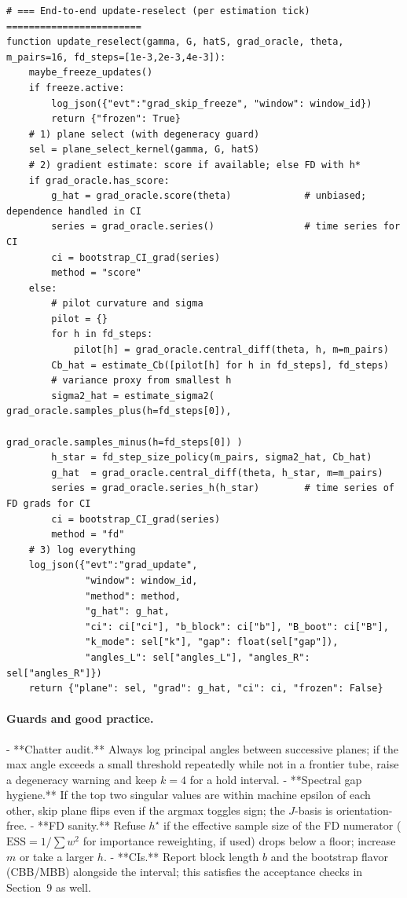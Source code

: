 \begin{lstlisting}
# === End-to-end update-reselect (per estimation tick) ========================
function update_reselect(gamma, G, hatS, grad_oracle, theta, m_pairs=16, fd_steps=[1e-3,2e-3,4e-3]):
    maybe_freeze_updates()
    if freeze.active:
        log_json({"evt":"grad_skip_freeze", "window": window_id})
        return {"frozen": True}
    # 1) plane select (with degeneracy guard)
    sel = plane_select_kernel(gamma, G, hatS)
    # 2) gradient estimate: score if available; else FD with h*
    if grad_oracle.has_score:
        g_hat = grad_oracle.score(theta)             # unbiased; dependence handled in CI
        series = grad_oracle.series()                # time series for CI
        ci = bootstrap_CI_grad(series)
        method = "score"
    else:
        # pilot curvature and sigma
        pilot = {}
        for h in fd_steps:
            pilot[h] = grad_oracle.central_diff(theta, h, m=m_pairs)
        Cb_hat = estimate_Cb([pilot[h] for h in fd_steps], fd_steps)
        # variance proxy from smallest h
        sigma2_hat = estimate_sigma2( grad_oracle.samples_plus(h=fd_steps[0]),
                                      grad_oracle.samples_minus(h=fd_steps[0]) )
        h_star = fd_step_size_policy(m_pairs, sigma2_hat, Cb_hat)
        g_hat  = grad_oracle.central_diff(theta, h_star, m=m_pairs)
        series = grad_oracle.series_h(h_star)        # time series of FD grads for CI
        ci = bootstrap_CI_grad(series)
        method = "fd"
    # 3) log everything
    log_json({"evt":"grad_update",
              "window": window_id,
              "method": method,
              "g_hat": g_hat,
              "ci": ci["ci"], "b_block": ci["b"], "B_boot": ci["B"],
              "k_mode": sel["k"], "gap": float(sel["gap"]),
              "angles_L": sel["angles_L"], "angles_R": sel["angles_R"]})
    return {"plane": sel, "grad": g_hat, "ci": ci, "frozen": False}
\end{lstlisting}

\paragraph{Guards and good practice.}
- **Chatter audit.** Always log principal angles between successive planes; if the max angle exceeds a small threshold repeatedly while not in a frontier tube, raise a degeneracy warning and keep \(k\!\!=\!4\) for a hold interval.  
- **Spectral gap hygiene.** If the top two singular values are within machine epsilon of each other, skip plane flips even if the argmax toggles sign; the \(J\)-basis is orientation-free.  
- **FD sanity.** Refuse \(h^\star\) if the effective sample size of the FD numerator (\(\mathrm{ESS}=1/\sum w^2\) for importance reweighting, if used) drops below a floor; increase \(m\) or take a larger \(h\).  
- **CIs.** Report block length \(b\) and the bootstrap flavor (CBB/MBB) alongside the interval; this satisfies the acceptance checks in Section~9 as well.


